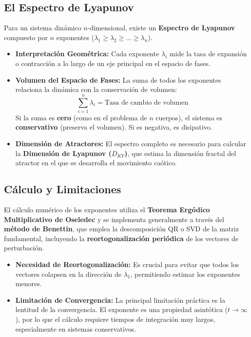\subsection{El Espectro de Lyapunov}

Para un sistema dinámico $n$-dimensional, existe un \textbf{Espectro de Lyapunov} compuesto por $n$ exponentes ($\lambda_1 \ge \lambda_2 \ge \ldots \ge \lambda_n$).

\begin{itemize}
    \item \textbf{Interpretación Geométrica:} Cada exponente $\lambda_i$ mide la tasa de expansión o contracción a lo largo de un eje principal en el espacio de fases.
    \item \textbf{Volumen del Espacio de Fases:} La suma de todos los exponentes relaciona la dinámica con la conservación de volumen:
        $$\sum_{i=1}^n \lambda_i = \text{Tasa de cambio de volumen}$$
        Si la suma es \textbf{cero} (como en el problema de $n$ cuerpos), el sistema es \textbf{conservativo} (preserva el volumen). Si es negativa, es disipativo.
    \item \textbf{Dimensión de Atractores:} El espectro completo es necesario para calcular la \textbf{Dimensión de Lyapunov ($D_{KY}$)}, que estima la dimensión fractal del atractor en el que se desarrolla el movimiento caótico.
\end{itemize}

\subsection{Cálculo y Limitaciones}

El cálculo numérico de los exponentes utiliza el \textbf{Teorema Ergódico Multiplicativo de Oseledec} y se implementa generalmente a través del \textbf{método de Benettin}, que emplea la descomposición QR o SVD de la matriz fundamental, incluyendo la \textbf{reortogonalización periódica} de los vectores de perturbación.

\begin{itemize}
    \item \textbf{Necesidad de Reortogonalización:} Es crucial para evitar que todos los vectores colapsen en la dirección de $\lambda_1$, permitiendo estimar los exponentes menores.
    \item \textbf{Limitación de Convergencia:} La principal limitación práctica es la lentitud de la convergencia. El exponente es una propiedad asintótica ($t \to \infty$), por lo que el cálculo requiere tiempos de integración muy largos, especialmente en sistemas conservativos.
\end{itemize}